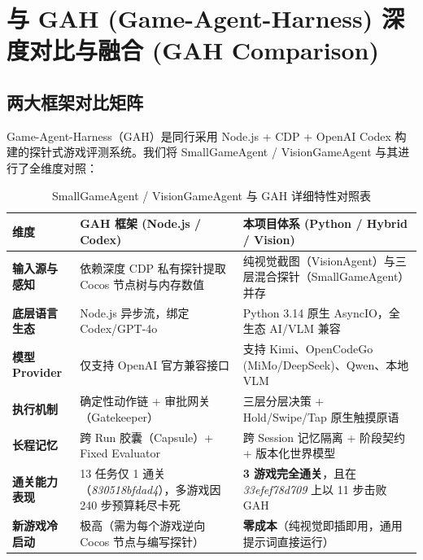 \documentclass[11pt,a4paper]{ctexart}
\begin{document}
\newpage
\section{与 GAH (Game-Agent-Harness) 深度对比与融合 (GAH Comparison)}

\subsection{两大框架对比矩阵}
Game-Agent-Harness（GAH）是同行采用 Node.js + CDP + OpenAI Codex 构建的探针式游戏评测系统。我们将 SmallGameAgent / VisionGameAgent 与其进行了全维度对照：

\begin{table}[htbp]
\centering
\small
\caption{SmallGameAgent / VisionGameAgent 与 GAH 详细特性对照表}
\label{tab:gah_comparison}
\begin{tabular}{p{3.2cm}p{4.5cm}p{4.8cm}}
\toprule
\textbf{维度} & \textbf{GAH 框架 (Node.js / Codex)} & \textbf{本项目体系 (Python / Hybrid / Vision)} \\
\midrule
\textbf{输入源与感知} & 依赖深度 CDP 私有探针提取 Cocos 节点树与内存数值 & 纯视觉截图（VisionAgent）与三层混合探针（SmallGameAgent）并存 \\
\textbf{底层语言生态} & Node.js 异步流，绑定 Codex/GPT-4o & Python 3.14 原生 AsyncIO，全生态 AI/VLM 兼容 \\
\textbf{模型 Provider} & 仅支持 OpenAI 官方兼容接口 & 支持 Kimi、OpenCodeGo (MiMo/DeepSeek)、Qwen、本地 VLM \\
\textbf{执行机制} & 确定性动作链 + 审批网关（Gatekeeper） & 三层分层决策 + Hold/Swipe/Tap 原生触摸原语 \\
\textbf{长程记忆} & 跨 Run 胶囊（Capsule）+ Fixed Evaluator & 跨 Session 记忆隔离 + 阶段契约 + 版本化世界模型 \\
\textbf{通关能力表现} & 13 任务仅 1 通关（\textit{830518bfdad4}），多游戏因 240 步预算耗尽卡死 & \textbf{3 游戏完全通关}，且在 \textit{33efef78d709} 上以 11 步击败 GAH \\
\textbf{新游戏冷启动} & 极高（需为每个游戏逆向 Cocos 节点与编写探针） & \textbf{零成本}（纯视觉即插即用，通用提示词直接运行） \\
\bottomrule
\end{tabular}
\end{table}
\end{document}
